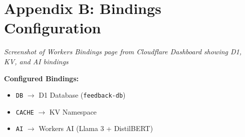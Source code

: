 \documentclass[11pt,a4paper]{article}
\begin{document}
\section*{Appendix B: Bindings Configuration}

\textit{Screenshot of Workers Bindings page from Cloudflare Dashboard showing D1, KV, and AI bindings}

\vspace{1cm}

\begin{center}
\end{center}

\vspace{1cm}

\textbf{Configured Bindings:}
\begin{itemize}
    \item \texttt{DB} $\rightarrow$ D1 Database (\texttt{feedback-db})
    \item \texttt{CACHE} $\rightarrow$ KV Namespace
    \item \texttt{AI} $\rightarrow$ Workers AI (Llama 3 + DistilBERT)
\end{itemize}
\end{document}
